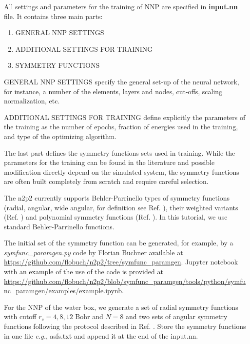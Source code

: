 \documentclass[12pt]{article}
\begin{document}
All settings and parameters for the training of NNP are specified in \textbf{input.nn} file. It contains three main parts:
\begin{enumerate}
    \item GENERAL NNP SETTINGS
    \item ADDITIONAL SETTINGS FOR TRAINING
    \item SYMMETRY FUNCTIONS
\end{enumerate}

GENERAL NNP SETTINGS specify the general set-up of the neural network, for instance, a number of the elements, layers and nodes, cut-offs, scaling normalization, etc.

ADDITIONAL SETTINGS FOR TRAINING define explicitly the parameters of the training as the number of epochs, fraction of energies used in the training, and type of the optimizing algorithm. 

The last part defines the symmetry functions sets used in training. While the parameters for the training can be found in the literature and possible modification directly depend on the simulated system, the symmetry functions are often built completely from scratch and require careful selection.

The n2p2 currently supports Behler-Parrinello types of symmetry functions (radial, angular, wide angular, for definition see Ref. ), their weighted variants (Ref. ) and polynomial symmetry functions (Ref. ). In this tutorial, we use standard Behler-Parrinello functions.

The initial set of the symmetry function can be generated, for example, by a \textit{symfunc\_paramgen.py} code by Florian Buchner available at \url{https://github.com/flobuch/n2p2/tree/symfunc_paramgen}. Jupyter notebook with an example of the use of the code is provided at \url{https://github.com/flobuch/n2p2/blob/symfunc_paramgen/tools/python/symfunc_paramgen/examples/example.ipynb}.

For the NNP of the water box, we generate a set of radial symmetry functions with cutoff $r_c = 4, 8, 12$ Bohr and $N = 8$ and two sets of angular symmetry functions following the protocol described in Ref. .  Store the symmetry functions in one file \textit{e.g.},  asfs.txt and append it at the end of the input.nn.

\begin{center}
\end{center}
\end{document}
